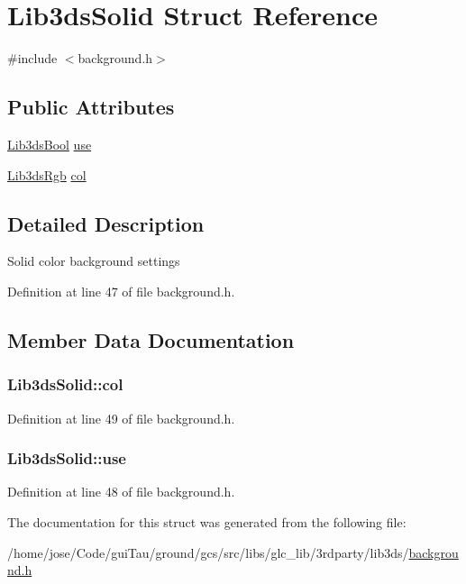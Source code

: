 \hypertarget{struct_lib3ds_solid}{\section{Lib3ds\-Solid Struct Reference}
\label{struct_lib3ds_solid}
}


{\ttfamily \#include $<$background.\-h$>$}

\subsection*{Public Attributes}
\begin{DoxyCompactItemize}
\item 
\hyperlink{types_8h_a89dd7398a9ebbbf28011f8c32df67ad3}{Lib3ds\-Bool} \hyperlink{struct_lib3ds_solid_ad1d92c23ba6a0fb60dc5becfb5bece35}{use}
\item 
\hyperlink{types_8h_a7e320d64d2488320001f7f3b25168ee3}{Lib3ds\-Rgb} \hyperlink{struct_lib3ds_solid_aaa35329597e74f76a6f09b659063f95d}{col}
\end{DoxyCompactItemize}


\subsection{Detailed Description}
Solid color background settings 

Definition at line 47 of file background.\-h.



\subsection{Member Data Documentation}
\hypertarget{struct_lib3ds_solid_aaa35329597e74f76a6f09b659063f95d}{
\subsubsection[{col}]{ Lib3ds\-Solid\-::col}}\label{struct_lib3ds_solid_aaa35329597e74f76a6f09b659063f95d}


Definition at line 49 of file background.\-h.

\hypertarget{struct_lib3ds_solid_ad1d92c23ba6a0fb60dc5becfb5bece35}{
\subsubsection[{use}]{ Lib3ds\-Solid\-::use}}\label{struct_lib3ds_solid_ad1d92c23ba6a0fb60dc5becfb5bece35}


Definition at line 48 of file background.\-h.



The documentation for this struct was generated from the following file\-:\begin{DoxyCompactItemize}
\item 
/home/jose/\-Code/gui\-Tau/ground/gcs/src/libs/glc\-\_\-lib/3rdparty/lib3ds/\hyperlink{background_8h}{background.\-h}\end{DoxyCompactItemize}
